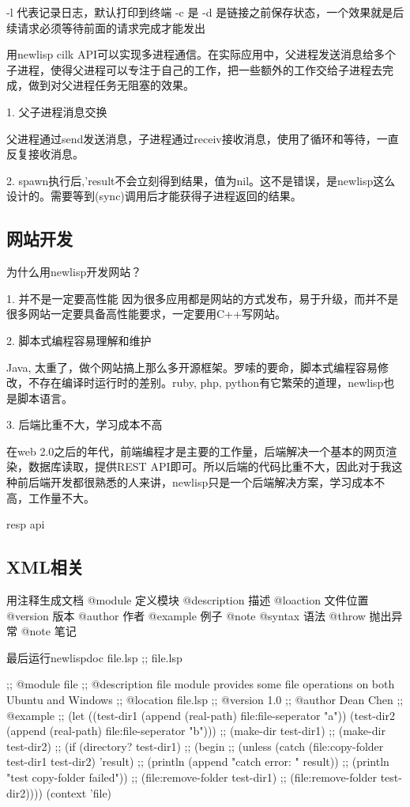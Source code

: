 \documentclass[cn,11pt]{elegantbook}
\begin{document}
-l 代表记录日志，默认打印到终端
-c 是
-d 是链接之前保存状态，一个效果就是后续请求必须等待前面的请求完成才能发出


用newlisp cilk API可以实现多进程通信。在实际应用中，父进程发送消息给多个子进程，使得父进程可以专注于自己的工作，把一些额外的工作交给子进程去完成，做到对父进程任务无阻塞的效果。

1. 父子进程消息交换

父进程通过send发送消息，子进程通过receiv接收消息，使用了循环和等待，一直反复接收消息。

2. spawn执行后,'result不会立刻得到结果，值为nil。这不是错误，是newlisp这么设计的。需要等到(sync)调用后才能获得子进程返回的结果。

\subsection{网站开发}

为什么用newlisp开发网站？

1. 并不是一定要高性能
因为很多应用都是网站的方式发布，易于升级，而并不是很多网站一定要具备高性能要求，一定要用C++写网站。

2. 脚本式编程容易理解和维护

Java, 太重了，做个网站搞上那么多开源框架。罗嗦的要命，脚本式编程容易修改，不存在编译时运行时的差别。ruby, php, python有它繁荣的道理，newlisp也是脚本语言。

3. 后端比重不大，学习成本不高

在web 2.0之后的年代，前端编程才是主要的工作量，后端解决一个基本的网页渲染，数据库读取，提供REST API即可。所以后端的代码比重不大，因此对于我这种前后端开发都很熟悉的人来讲，newlisp只是一个后端解决方案，学习成本不高，工作量不大。

resp api
 
\subsection{XML相关}

用注释生成文档
@module 定义模块
@description 描述
@loaction 文件位置
@version 版本
@author 作者
@example 例子
@note
@syntax 语法
@throw 抛出异常
@note 笔记

最后运行newlispdoc file.lsp 
;; file.lsp

;; @module file
;; @description file module provides some file operations on both Ubuntu and Windows
;; @location file.lsp
;; @version 1.0
;; @author Dean Chen
;; @example
;; (let ((test-dir1 (append (real-path) file:file-seperator "a")) (test-dir2 (append (real-path) file:file-seperator "b")))
;;   (make-dir test-dir1)
;;   (make-dir test-dir2)
;;   (if (directory? test-dir1)
;;       (begin
;; 	(unless (catch (file:copy-folder test-dir1 test-dir2) 'result)
;; 		(println (append "catch error: " result))
;; 		(println "test copy-folder failed"))
;; 	(file:remove-folder test-dir1)
;; 	(file:remove-folder test-dir2))))
(context 'file)
\end{document}
